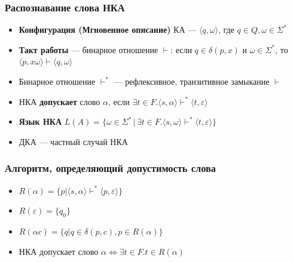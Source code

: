 \documentclass{beamer}
\begin{document}
\begin{frame}[fragile]
  \transwipe[direction=90]
  \frametitle{Распознавание слова НКА}
  \begin{itemize}
    \item \textbf{Конфигурация (Мгновенное описание)} КА --- $\langle q, \omega \rangle$, где $q \in Q, \omega \in \Sigma^*$
    \item \textbf{Такт работы} --- бинарное отношение $\vdash$: если $q \in \delta(p, x)$ и $\omega \in \Sigma ^*$, то $\langle p , x \omega \rangle \vdash \langle q , \omega \rangle$
    \item Бинарное отношение $\vdash^*$ --- рефлексивное, транзитивное замыкание $\vdash$
    \item НКА \textbf{допускает} слово $\alpha$, если $\exists t \in F. \langle s, \alpha \rangle \vdash^* \langle t, \varepsilon \rangle$
    \item \textbf{Язык НКА} $L(A) = \{ \omega \in \Sigma^* \, | \, \exists t \in F. \langle s, \omega \rangle \vdash^* \langle t, \varepsilon \rangle \}$ 
  \end{itemize}
  \begin{itemize}
    \item ДКА --- частный случай НКА
  \end{itemize}
\end{frame}

\begin{frame}[fragile]
  \transwipe[direction=90]
  \frametitle{Алгоритм, определяющий допустимость слова}
  \begin{itemize}
    \item $R(\alpha) = \{ p | \langle s, \alpha \rangle \vdash^* \langle p, \varepsilon \rangle\}$
    \item $R(\varepsilon) = \{q_0\}$
    \item $R(\alpha c) = \{q | q \in \delta (p, c), p \in R(\alpha)\}$
    \item НКА допускает слово $\alpha \Leftrightarrow \exists t \in F. t \in R(\alpha) $
  \end{itemize}
\end{frame}
\end{document}
